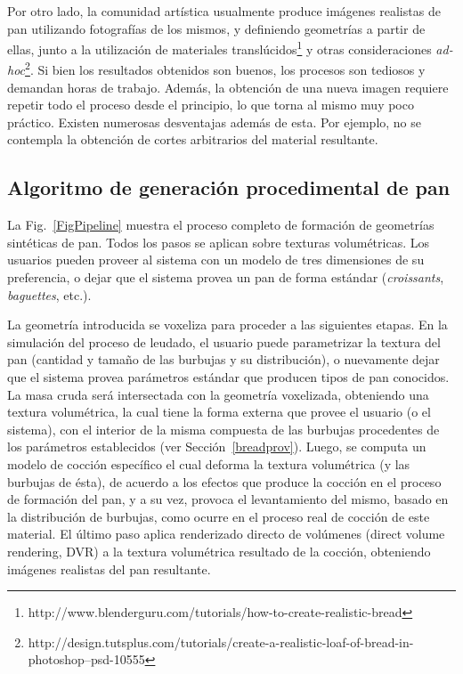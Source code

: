 Por otro lado, la comunidad artística usualmente produce imágenes realistas de pan utilizando fotografías de los mismos, y definiendo geometrías a partir de ellas, junto a la utilización de materiales translúcidos\footnote{http://www.blenderguru.com/tutorials/how-to-create-realistic-bread} y otras consideraciones {\em ad-hoc}\footnote{http://design.tutsplus.com/tutorials/create-a-realistic-loaf-of-bread-in-photoshop--psd-10555}.
Si bien los resultados obtenidos son buenos, los procesos son tediosos y demandan horas de trabajo.
Además, la obtención de una nueva imagen requiere repetir todo el proceso desde el principio, lo que torna al mismo muy poco práctico.
Existen numerosas desventajas además de esta.
Por ejemplo, no se contempla la obtención de cortes arbitrarios del material resultante.


\subsection{Algoritmo de generación procedimental de pan}
La Fig.~\ref{FigPipeline} muestra el proceso completo de formación de geometrías sintéticas de pan.
Todos los pasos se aplican sobre texturas volumétricas.
Los usuarios pueden proveer al sistema con un modelo de tres dimensiones de su preferencia, o dejar que el sistema provea un pan de forma estándar ({\em croissants}, {\em baguettes}, etc.).

La geometría introducida se voxeliza para proceder a las siguientes etapas.
En la simulación del proceso de leudado, el usuario puede parametrizar la textura del pan (cantidad y tamaño de las burbujas y su distribución), o nuevamente dejar que el sistema provea parámetros estándar que producen tipos de pan conocidos.
La masa cruda será intersectada con la geometría voxelizada, obteniendo una textura volumétrica, la cual tiene la forma externa que provee el usuario (o el sistema), con el interior de la misma compuesta de las burbujas procedentes de los parámetros establecidos (ver Sección~\ref{breadprov}).
Luego, se computa un modelo de cocción específico \cite{Powathil2004} el cual deforma la textura volumétrica (y las burbujas de ésta), de acuerdo a los efectos que produce la cocción en el proceso de formación del pan, y a su vez, provoca el levantamiento del mismo, basado en la distribución de burbujas, como ocurre en el proceso real de cocción de este material.
El último paso aplica renderizado directo de volúmenes (direct volume rendering, DVR) \cite{Kruger2003} a la textura volumétrica resultado de la cocción, obteniendo imágenes realistas del pan resultante.

